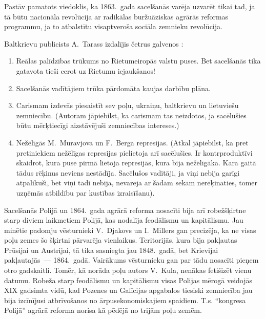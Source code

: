 \documentclass[twoside,a5paper,12pt,fleqn,openany]{extbook}
\begin{document}
Pastāv pamatots viedoklis, ka 1863.~gada sacelšanās varēja uzvarēt tikai tad, ja tā būtu nacionāla revolūcija ar radikālas buržuāziskas agrārās reformas programmu, ja to atbalstītu visaptveroša sociāla zemnieku revolūcija.

Baltkrievu publicists A.~Tarass izdalījis četrus galvenos :

\begin{enumerate}

\item Reālas palīdzības trūkums no Rietumeiropās valstu puses. Bet sacelšanās tika gatavota tieši cerot uz Rietumu iejaukšanos!

\item Sacelšanās vadītājiem trūka pārdomāta kaujas darbību plāna.

\item Carismam izdevās piesaistīt sev poļu, ukraiņu, baltkrievu un lietuviešu zemniecību. (Autoram jāpiebilst, ka carismam tas neizdotos, ja sacēlušies būtu mērķtiecīgi aizstāvējuši zemniecības intereses.)

\item Nežēlīgās M.~Muravjova un F.~Berga represijas. (Atkal jāpiebilst, ka pret pretiniekiem nežēlīgas represijas pielietoja arī sacēlušies. Ir kontrproduktīvi skaidrot, kura puse pirmā lietoja represijās, kura bija nežēlīgāka. Kara gaitā tādus rēķinus neviens nestādīja. Sacēlušos vadītāji, ja viņi nebija garīgi atpalikuši, bet viņi tādi nebija, nevarēja ar šādām sekām nerēķināties, tomēr uzņēmās atbildību par kustības izraisīšanu).

\end{enumerate}



Sacelšanās Polijā un 1864.~gada agrārā reforma nosacīti bija arī robežšķirtne starp diviem laikmetiem Polijā, kas nodalīja feodālismu un kapitālismu. Jau minētie padomju vēsturnieki V.~Djakovs un I.~Millers gan precizēja, ka ne visas poļu zemes šo šķirtni pārvarēja vienlaikus. Teritorijās, kura bija pakļautas Prūsijai un Austrijai, tā tika sasniegta jau 1848.~gadā, bet Krievijai pakļautajās~--- 1864.~gadā. Vairākums vēsturnieku gan par tādu nosacīti pieņem otro gadskaitli. Tomēr, kā norāda poļu autors V.~Kula, nenākas fetišizēt vienu datumu. Robeža starp feodālismu un kapitālismu visas Polijas mērogā veidojās XIX gadsimta vidū, kad Pozenes un Galīcijas apgabalos tiesiski zemniecība jau bija izcīnījusi atbrīvošanos no ārpusekonomiskajiem spaidiem. T.s. ``kongresa Polijā'' agrārā reforma norisa kā pēdējā no trijām poļu zemēm.
\end{document}
